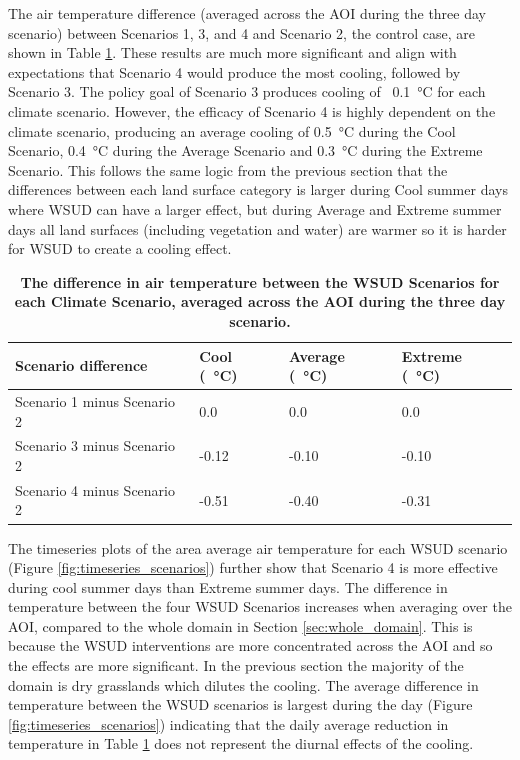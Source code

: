 \documentclass[final,3p,times,authoryear]{elsarticle}
\begin{document}
The air temperature difference (averaged across the AOI during the three day scenario) between Scenarios 1, 3, and 4 and Scenario 2, the control case, are shown in Table \ref{tab:scenarioDiffRep}. These results are much more significant and align with expectations that Scenario 4 would produce the most cooling, followed by Scenario 3. The policy goal of Scenario 3 produces cooling of ~0.1\SI{}{\degreeCelsius} for each climate scenario. However, the efficacy of Scenario 4 is highly dependent on the climate scenario, producing an average cooling of 0.5\SI{}{\degreeCelsius} during the Cool Scenario, 0.4\SI{}{\degreeCelsius} during the Average Scenario and 0.3\SI{}{\degreeCelsius} during the Extreme Scenario. This follows the same logic from the previous section that the differences between each land surface category is larger during Cool summer days where WSUD can have a larger effect, but during Average and Extreme summer days all land surfaces (including vegetation and water) are warmer so it is harder for WSUD to create a cooling effect.


\begin{table}[!htbp]
\caption{\bf The difference in air temperature between the WSUD Scenarios for each Climate Scenario, averaged across the AOI during the three day scenario. \label{tab:scenarioDiffRep}}     
\begin{tabular}{ l l l l}
\textbf{Scenario difference} & \textbf{Cool (\SI{}{\degreeCelsius})}
& \textbf{Average (\SI{}{\degreeCelsius})}
& \textbf{Extreme (\SI{}{\degreeCelsius})}\\ \hline
Scenario 1 minus Scenario 2 & 0.0  & 0.0 & 0.0\\ 
Scenario 3 minus Scenario 2 & -0.12  & -0.10 & -0.10\\ 
Scenario 4 minus Scenario 2 & -0.51  & -0.40 & -0.31\\ 
\hline
\end{tabular}
\end{table}



The timeseries plots of the area average air temperature for each WSUD scenario (Figure \ref{fig:timeseries_scenarios}) further show that Scenario 4 is more effective during cool summer days than Extreme summer days. The difference in temperature between the four WSUD Scenarios increases when averaging over the AOI, compared to the whole domain in Section \ref{sec:whole_domain}. This is because the WSUD interventions are more concentrated across the AOI and so the effects are more significant. In the previous section the majority of the domain is dry grasslands which dilutes the cooling. The average difference in temperature between the WSUD scenarios is largest during the day (Figure \ref{fig:timeseries_scenarios}) indicating that the daily average reduction in temperature in Table \ref{tab:scenarioDiffRep} does not represent the diurnal effects of the cooling.
\end{document}
